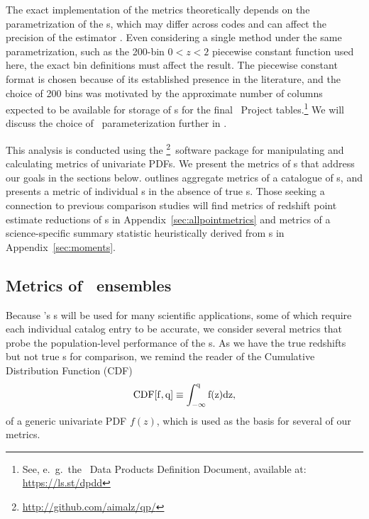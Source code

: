 The exact implementation of the metrics theoretically depends on the parametrization of the \pzpdf s, which may differ across codes and can affect the precision of the estimator \citep{malz_approximating_2018}.
Even considering a single method under the same parametrization, such as the 200-bin $0 < z < 2$ piecewise constant function used here, the exact bin definitions must affect the result.
The piecewise constant format is chosen because of its established presence in the literature, and the choice of 200 bins was motivated by the approximate number of columns expected to be available for storage of \pzpdf s for the final \lsst\ Project tables.\footnote{See, e.~g.~the \lsst\ Data Products Definition Document, available at: \url{https://ls.st/dpdd}}
We will discuss the choice of \pzpdf\ parameterization further in .

This analysis is conducted using the \qp\footnote{\url{http://github.com/aimalz/qp/}}\ software package \citep{malz_qp_2017} for manipulating and calculating metrics of univariate PDFs.
We present the metrics of \pzpdf s that address our goals in the sections below.
 outlines aggregate metrics of a catalogue of \pzpdf s, and  presents a metric of individual \pzpdf s in the absence of true \pzpdf s.
Those seeking a connection to previous comparison studies will find metrics of redshift point estimate reductions of \pzpdf s in Appendix~\ref{sec:allpointmetrics} and metrics of a science-specific summary statistic heuristically derived from \pzpdf s in Appendix~\ref{sec:moments}.

\subsection{Metrics of \pzpdf \ ensembles}

Because \lsst's \pzpdf s will be used for many scientific applications, some of which require each individual catalog entry to be accurate, we consider several metrics that probe the population-level performance of the \pzpdf s.
As we have the true redshifts but not true \pzpdf s for comparison, we remind the reader of the Cumulative Distribution Function (CDF)
\begin{equation}
\eqlabel{eq:cdf}
\rm{CDF}[f, q] \equiv \int_{-\infty}^{q} f(z) dz,
\end{equation}
of a generic univariate PDF $f(z)$, which is used as the basis for several of our metrics.

